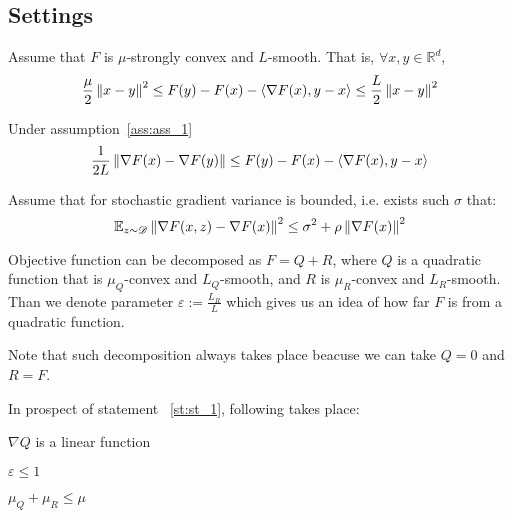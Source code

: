\subsection{Settings} \label{subsec:settings}

\begin{assumption} \label{ass:ass_1}
    Assume that $F$ is $\mu$-strongly convex and $L$-smooth. That is, $\forall x, y \in \mathbb{R}^d$,
    \[
    \frac{\mu}{2} \left\|x - y\right\|^2 \leq F(y) - F(x) - \langle \nabla F(x), y-x\rangle \leq \frac{L}{2} \left\|x-y\right\|^2
    \]
\end{assumption}

\begin{corollary} \label{cor:nesterov}
Under assumption~\ref{ass:ass_1}
    \[
    \frac{1}{2L} \left\|\nabla F(x) - \nabla F(y)\right\| \leq F(y) - F(x) - \langle \nabla F(x), y-x\rangle
    \]
\end{corollary}

\begin{assumption} \label{ass:ass_2}
    Assume that for stochastic gradient variance is bounded, i.e. exists such $\sigma$ that:
    \[\mathbb{E}_{z \sim \mathcal{D}} \left\|\nabla F(x, z) - \nabla F(x)\right\|^2 \leq \sigma^2
    + \rho \left\|\nabla F(x)\right\|^2 \]
\end{assumption}

\begin{statement} \label{st:st_1}
    Objective function can be decomposed as $F = Q + R$, where $Q$ is a quadratic function that is $\mu_Q$-convex and $L_Q$-smooth, and $R$ is $\mu_R$-convex and $L_R$-smooth. Than we denote parameter
    \(\varepsilon := \frac{L_R}{L}\)
    which gives us an idea of how far $F$ is from a quadratic function.
\end{statement}

Note that such decomposition always takes place beacuse we can take $Q = 0$ and $R = F$.


In prospect of statement ~\ref{st:st_1}, following takes place:
\begin{corollary} \label{cor:linearity}
    $\nabla Q$ is a linear function
\end{corollary}

\begin{corollary}
    \(\varepsilon \leq 1\)
\end{corollary}

\begin{corollary} \label{cor:mu}
    \(\mu_Q + \mu_R \leq \mu\)
\end{corollary}